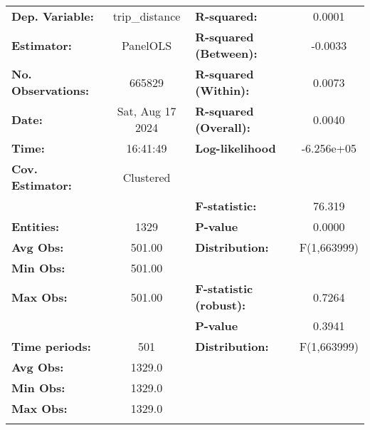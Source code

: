 \begin{center}
\begin{tabular}{lclc}
\toprule
\textbf{Dep. Variable:}    &   trip\_distance   & \textbf{  R-squared:         }   &      0.0001      \\
\textbf{Estimator:}        &      PanelOLS      & \textbf{  R-squared (Between):}  &     -0.0033      \\
\textbf{No. Observations:} &       665829       & \textbf{  R-squared (Within):}   &      0.0073      \\
\textbf{Date:}             &  Sat, Aug 17 2024  & \textbf{  R-squared (Overall):}  &      0.0040      \\
\textbf{Time:}             &      16:41:49      & \textbf{  Log-likelihood     }   &    -6.256e+05    \\
\textbf{Cov. Estimator:}   &     Clustered      & \textbf{                     }   &                  \\
\textbf{}                  &                    & \textbf{  F-statistic:       }   &      76.319      \\
\textbf{Entities:}         &        1329        & \textbf{  P-value            }   &      0.0000      \\
\textbf{Avg Obs:}          &       501.00       & \textbf{  Distribution:      }   &   F(1,663999)    \\
\textbf{Min Obs:}          &       501.00       & \textbf{                     }   &                  \\
\textbf{Max Obs:}          &       501.00       & \textbf{  F-statistic (robust):} &      0.7264      \\
\textbf{}                  &                    & \textbf{  P-value            }   &      0.3941      \\
\textbf{Time periods:}     &        501         & \textbf{  Distribution:      }   &   F(1,663999)    \\
\textbf{Avg Obs:}          &       1329.0       & \textbf{                     }   &                  \\
\textbf{Min Obs:}          &       1329.0       & \textbf{                     }   &                  \\
\textbf{Max Obs:}          &       1329.0       & \textbf{                     }   &                  \\
\textbf{}                  &                    & \textbf{                     }   &                  \\
\bottomrule

\end{tabular}
\end{center}

